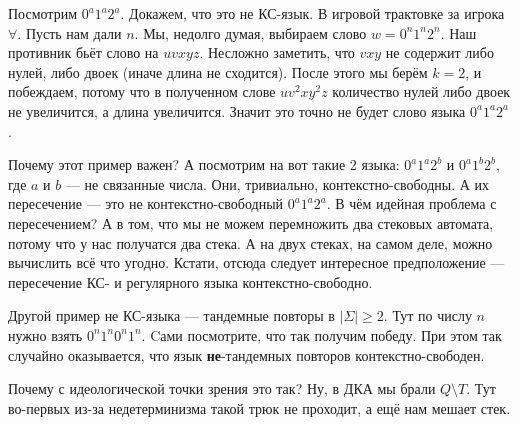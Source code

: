 \documentclass{article}
\begin{document}
\begin{itemize}
\begin{Proof}
        \end{Proof}
        \begin{Example}
            Посмотрим $0^a1^a2^a$. Докажем, что это не КС-язык. В игровой трактовке за игрока $\forall$. Пусть нам дали $n$. Мы, недолго думая, выбираем слово $w=0^n1^n2^n$. Наш противник бьёт слово на $uvxyz$. Несложно заметить, что $vxy$ не содержит либо нулей, либо двоек (иначе длина не сходится). После этого мы берём $k=2$, и побеждаем, потому что в полученном слове $uv^2xy^2z$ количество нулей либо двоек не увеличится, а длина увеличится. Значит это точно не будет слово языка $0^a1^a2^a$.
        \end{Example}
        \begin{Comment}
            Почему этот пример важен? А посмотрим на вот такие 2 языка: $0^a1^a2^b$ и $0^a1^b2^b$, где $a$ и $b$ --- не связанные числа. Они, тривиально, контекстно-свободны. А их пересечение --- это не контекстно-свободный $0^a1^a2^a$. В чём идейная проблема с пересечением? А в том, что мы не можем перемножить два стековых автомата, потому что у нас получатся два стека. А на двух стеках, на самом деле, можно вычислить всё что угодно. Кстати, отсюда следует интересное предположение --- пересечение КС- и регулярного языка контекстно-свободно.
        \end{Comment}
        \begin{Example}
            Другой пример не КС-языка --- тандемные повторы в $|\Sigma|\geqslant2$. Тут по числу $n$ нужно взять $0^n1^n0^n1^n$. Cами посмотрите, что так получим победу. При этом так случайно оказывается, что язык \textbf{не}-тандемных повторов контекстно-свободен.
        \end{Example}
        \begin{Comment}
            Почему с идеологической точки зрения это так? Ну, в ДКА мы брали $Q\setminus T$. Тут во-первых из-за недетерминизма такой трюк не проходит, а ещё нам мешает стек.
        \end{Comment}
    \end{itemize}
\end{document}
